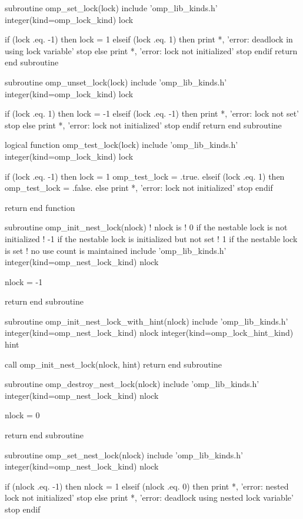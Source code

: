 {\begin{codepar}
subroutine omp\_set\_lock(lock)
  include 'omp\_lib\_kinds.h'
  integer(kind=omp\_lock\_kind) lock

  if (lock .eq. -1) then
    lock = 1
  elseif (lock .eq. 1) then
    print *, 'error: deadlock in using lock variable'
    stop
  else
    print *, 'error: lock not initialized'
    stop
  endif
  return
end subroutine

subroutine omp\_unset\_lock(lock)
  include 'omp\_lib\_kinds.h'
  integer(kind=omp\_lock\_kind) lock

  if (lock .eq. 1) then
    lock = -1
  elseif (lock .eq. -1) then
    print *, 'error: lock not set'
    stop
  else
    print *, 'error: lock not initialized'
    stop
  endif
  return
end subroutine

logical function omp\_test\_lock(lock)
  include 'omp\_lib\_kinds.h'
  integer(kind=omp\_lock\_kind) lock

  if (lock .eq. -1) then
    lock = 1
    omp\_test\_lock = .true.
  elseif (lock .eq. 1) then
    omp\_test\_lock = .false.
  else
    print *, 'error: lock not initialized'
    stop
  endif

  return
end function

subroutine omp\_init\_nest\_lock(nlock)
  ! nlock is 
  ! 0 if the nestable lock is not initialized
  ! -1 if the nestable lock is initialized but not set
  ! 1 if the nestable lock is set
  ! no use count is maintained
  include 'omp\_lib\_kinds.h'
  integer(kind=omp\_nest\_lock\_kind) nlock

  nlock = -1

  return
end subroutine

subroutine omp\_init\_nest\_lock\_with\_hint(nlock)
  include 'omp\_lib\_kinds.h'
  integer(kind=omp\_nest\_lock\_kind) nlock
  integer(kind=omp\_lock\_hint\_kind) hint
  
  call omp\_init\_nest\_lock(nlock, hint)
  return
end subroutine

subroutine omp\_destroy\_nest\_lock(nlock)
  include 'omp\_lib\_kinds.h'
  integer(kind=omp\_nest\_lock\_kind) nlock

  nlock = 0

  return
end subroutine

subroutine omp\_set\_nest\_lock(nlock)
  include 'omp\_lib\_kinds.h'
  integer(kind=omp\_nest\_lock\_kind) nlock

  if (nlock .eq. -1) then
    nlock = 1
  elseif (nlock .eq. 0) then
    print *, 'error: nested lock not initialized'
    stop
  else
    print *, 'error: deadlock using nested lock variable'
    stop
  endif


\end{codepar}}
